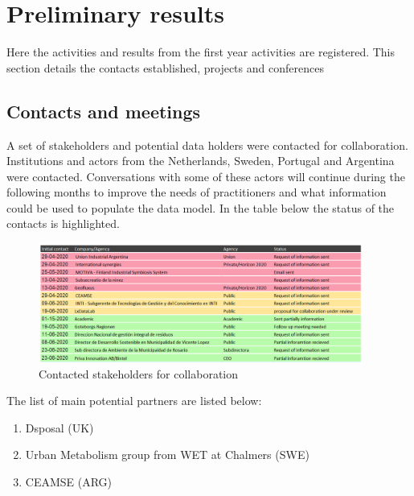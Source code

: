 \chapter{Preliminary results}
Here the activities and results from the first year activities are registered. This section details the contacts established, projects and conferences 



\section{Contacts and meetings}
A set of stakeholders and potential data holders were contacted for collaboration. Institutions and actors from the Netherlands, Sweden, Portugal and Argentina were contacted. Conversations with some of these actors will continue during the following months to improve the needs of practitioners and what information could be used to populate the data model. In the table below the status of the contacts is highlighted. 
\begin{figure}[h!]
    \centering
    \includegraphics[width=0.95\textwidth]{sections/asset/contacts.PNG}
    \caption{Contacted stakeholders for collaboration}
    \label{fig:collaboration}
\end{figure}

The list of main potential partners are listed below:
\begin{enumerate}
    \item Dsposal (UK)
    \item Urban Metabolism group from WET at Chalmers (SWE)
    \item CEAMSE (ARG) 
\end{enumerate}



